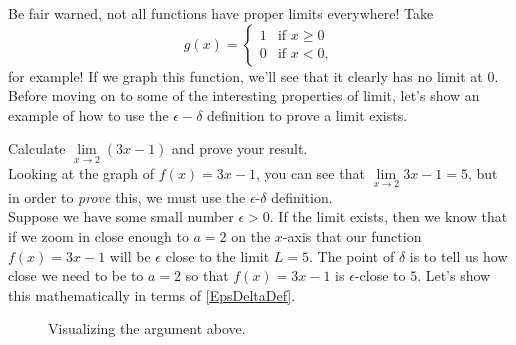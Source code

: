 Be fair warned, not all functions have proper limits everywhere! Take
\[
g(x)=\begin{cases}
  1 & \text{if } x\geq 0\\
  0 & \text{if }  x<0,
\end{cases} %
\]for example! If we graph this function, we'll see that it clearly has no limit at 0. Before moving on to some of the interesting properties of limit, let's show an example of how to use the $\epsilon-\delta$ definition to prove a limit exists.
\begin{exmp}
  Calculate $\lim\limits_{x\to 2} (3x-1)$ and prove your result. \\

Looking at the graph of $f(x)=3x-1$, you can see that $\lim\limits_{x\to 2} 3x-1=5$, but in order to \emph{prove} this, we must use the $\epsilon$-$\delta$ definition.\\

Suppose we have some small number $\epsilon>0$. If the limit exists, then we know that if we zoom in close enough to $a=2$ on the $x$-axis that our function $f(x)=3x-1$ will be $\epsilon$ close to the limit $L=5$. The point of $\delta$ is to tell us how close we need to be to $a=2$ so that $f(x)=3x-1$ is $\epsilon$-close to $5$. Let's show this mathematically in terms of \cref{EpsDeltaDef}.\\

\begin{figure}
  \centering
{}
\caption{Visualizing the argument above.}
\end{figure}


\end{exmp}
